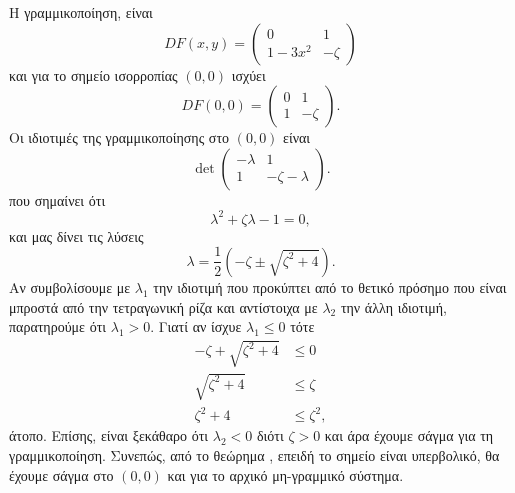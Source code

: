 \begin{solution}
    Η γραμμικοποίηση, είναι
    \begin{equation*}
        DF(x, y) =
        \begin{pmatrix}
            0 & 1 \\
            1 - 3x^2 & -\zeta
        \end{pmatrix}
    \end{equation*}
    και για το σημείο ισορροπίας \( (0, 0) \) ισχύει
    \begin{equation*}
        DF(0, 0) =
        \begin{pmatrix}
            0 & 1 \\
            1 & -\zeta
        \end{pmatrix}.
    \end{equation*}
    Οι ιδιοτιμές της γραμμικοποίησης στο \( (0, 0) \) είναι
    \begin{equation*}
        \det
        \begin{pmatrix}
            -\lambda & 1 \\
            1 & -\zeta - \lambda
        \end{pmatrix}.
    \end{equation*}
    που σημαίνει ότι
    \begin{equation*}
        \lambda^2 + \zeta \lambda - 1 = 0,
    \end{equation*}
    και μας δίνει τις λύσεις
    \begin{equation*}
        \lambda = \frac{1}{2}\left( -\zeta \pm \sqrt{\zeta^2 + 4} \right).
    \end{equation*}
    Αν συμβολίσουμε με \( \lambda_1 \) την ιδιοτιμή που προκύπτει από το θετικό
    πρόσημο που είναι μπροστά από την τετραγωνική ρίζα και αντίστοιχα με
    \( \lambda_2 \) την άλλη ιδιοτιμή, παρατηρούμε ότι \( \lambda_1 > 0 \).
    Γιατί αν ίσχυε \( \lambda_1 \leq 0 \) τότε
    \begin{align*}
        -\zeta + \sqrt{\zeta^2 + 4} &\leq 0 \\
        \sqrt{\zeta^2 + 4} &\leq \zeta \\
        \zeta^2 + 4 &\leq \zeta^2,
    \end{align*}
    άτοπο. Επίσης, είναι ξεκάθαρο ότι \( \lambda_2 < 0 \) διότι \( \zeta > 0 \)
    και άρα έχουμε σάγμα για τη γραμμικοποίηση. Συνεπώς, από το θεώρημα
    , επειδή το σημείο είναι υπερβολικό, θα έχουμε σάγμα στο
    \( (0, 0) \) και για το αρχικό μη-γραμμικό σύστημα.


\end{solution}
